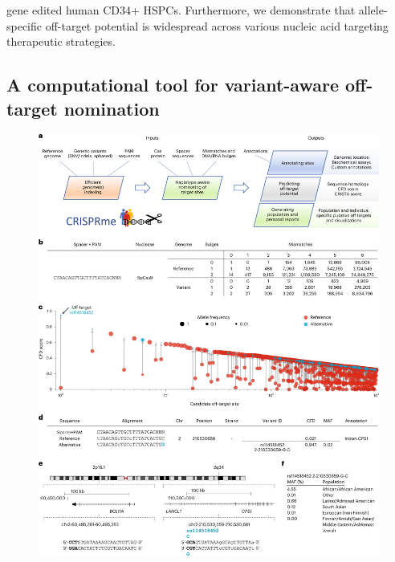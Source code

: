\documentclass[a4paper, titlepage, openright]{book}
\begin{document}
gene edited human CD34+ HSPCs. Furthermore, we demonstrate that allele-specific off-target potential is widespread across various nucleic acid targeting therapeutic strategies.
\subsection{A computational tool for variant-aware off-target nomination}
\begin{figure}
	\centering
	\includegraphics[width=\textwidth]{figures/crisprme1.png}

\end{figure}
\end{document}
